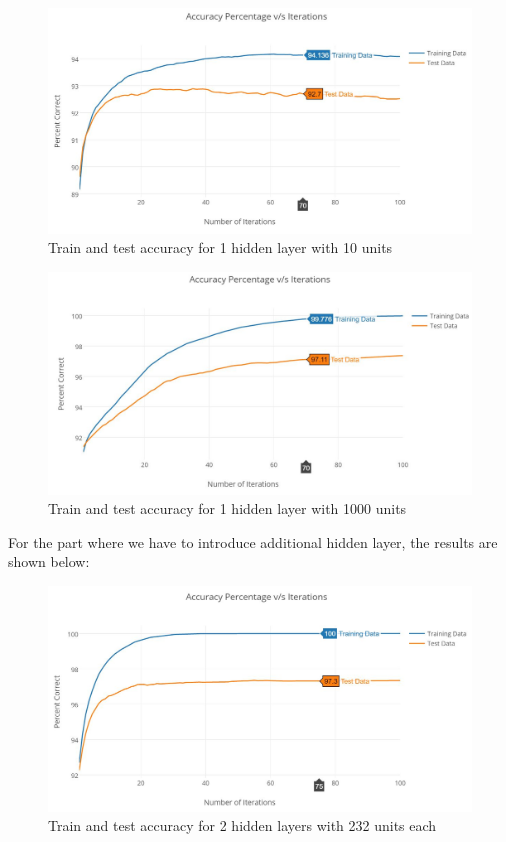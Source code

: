 \documentclass{article}
\begin{document}
\begin{figure}[h!]
  \centering
  \includegraphics[width=117mm]{graphs/Q5a_10HU.JPG}
  \caption{Train and test accuracy for 1 hidden layer with 10 units}
  \label{fig:5a_3}
\end{figure}

\begin{figure}[h!]
  \centering
  \includegraphics[width=115mm]{graphs/Q5a_1000HU.JPG}
  \caption{Train and test accuracy for 1 hidden layer with 1000 units}
  \label{fig:5a_4}
\end{figure}
\pagebreak
For the part where we have to introduce additional hidden layer, the results are shown below:

\begin{figure}[h!]
  \centering
  \includegraphics[width=117mm]{graphs/Q5b_232_232HU_point9Mom_point1LR_128BS_500iter.JPG}
  \caption{Train and test accuracy for 2 hidden layers with 232 units each}
  \label{fig:5b_1}
\end{figure}
\end{document}

